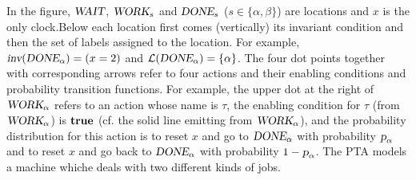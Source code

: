 \begin{example}\label{ex:pta}
In the figure, $\mbox{\sl WAIT}$, $\mbox{\sl WORK}_{s}$ and $\mbox{\sl DONE}_{s}$ ($ s\in \{ \alpha, \beta \}$) are locations 
and $x$ is the only clock.Below each location first comes (vertically) its invariant condition and then the set of labels assigned to the location. For example, $\mbox{\sl inv}(\mbox{\sl DONE}_{\alpha})=( x = 2 )$ 
and $\mathcal{L}(\mbox{\sl DONE}_{\alpha})=\{ \alpha \}$.
The four dot points together with corresponding arrows refer to four actions and their enabling conditions and probability transition functions.
For example, the upper dot at the right of $\mbox{\sl WORK}_{\alpha}$ refers to an action whose name 
is $\tau$, the enabling condition for $\tau$ (from $\mbox{\sl WORK}_{\alpha}$) is $\mathbf{true}$ (cf. the solid line emitting from $\mbox{\sl WORK}_{\alpha}$), and the probability distribution for this action is to reset 
$x$ and go to $\mbox{\sl DONE}_{\alpha}$ with probability $\mbox{\sl p}_{\alpha}$ and to reset $x$ and go back to 
$\mbox{\sl DONE}_{\alpha}$ with probability $1-\mbox{\sl p}_{\alpha}$.
The PTA models a machine whiche deals with two different kinds of jobs.
\end{example}
%
%



